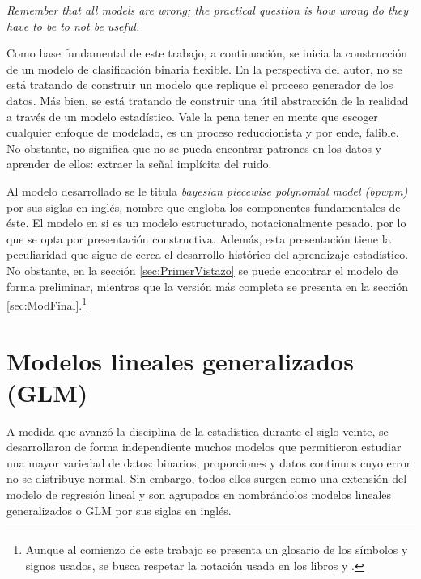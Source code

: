 \documentclass[../Main/Main.tex]{subfiles}
\begin{document}
\epigraph{\textit{Remember that all models are wrong; the practical question is how wrong do they have to be to not be useful.}}{\citet{box1976science}}

Como base fundamental de este trabajo, a continuación, se inicia la construcción de un modelo de clasificación binaria flexible. En la perspectiva del autor, no se está tratando de construir un modelo que replique el proceso generador de los datos. Más bien, se está tratando de construir una útil abstracción de la realidad a través de un modelo estadístico. Vale la pena tener en mente que escoger cualquier enfoque de modelado, es un proceso reduccionista y por ende, falible. No obstante, no significa que no se pueda encontrar patrones en los datos y aprender de ellos: extraer la señal implícita del ruido.

Al modelo desarrollado se le titula \textit{bayesian piecewise polynomial model (bpwpm)} por sus siglas en inglés, nombre que engloba los componentes fundamentales de  éste. El modelo en si es un modelo estructurado, notacionalmente pesado, por lo que se opta por presentación constructiva. Además, esta presentación tiene la peculiaridad que sigue de cerca el desarrollo histórico del aprendizaje estadístico. No obstante, en la sección \ref{sec:PrimerVistazo} se puede encontrar el modelo de forma preliminar, mientras que la versión más completa se presenta en la sección \ref{sec:ModFinal}.\footnote{Aunque al comienzo de este trabajo se presenta un glosario de los símbolos y signos usados, se busca respetar la notación usada en los libros \citet{hastie2008elements} y \citet{james2013introduction}.}

\section{Modelos lineales generalizados (GLM)} \label{sec:GLM}
A medida que avanzó la disciplina de la estadística durante el siglo veinte, se desarrollaron de forma independiente muchos modelos que permitieron estudiar una mayor variedad de datos: binarios, proporciones y datos continuos cuyo error no se distribuye normal. Sin embargo, todos ellos surgen como una extensión del modelo de regresión lineal y son agrupados en \citet{maccullagh1989generalized} nombrándolos modelos lineales generalizados o GLM por sus siglas en inglés. 
\end{document}
